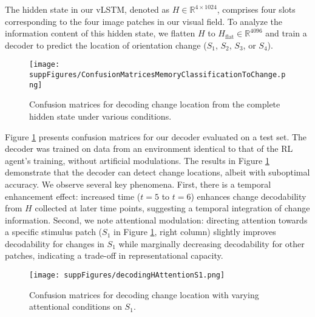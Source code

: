 \documentclass[12pt]{article}
\begin{document}
The hidden state in our vLSTM, denoted as $H \in \mathbb{R}^{4 \times 1024}$, comprises four slots corresponding to the four image patches in our visual field. To analyze the information content of this hidden state, we flatten $H$ to $H_\text{flat} \in \mathbb{R}^{4096}$ and train a decoder to predict the location of orientation change ($S_1$, $S_2$, $S_3$, or $S_4$).

\begin{figure}[htbp]
    \centering
    \texttt{[image: suppFigures/ConfusionMatricesMemoryClassificationToChange.png]}
    \caption{Confusion matrices for decoding change location from the complete hidden state under various conditions.}
    \label{fig:ConfMatHAllSlots}
\end{figure}


Figure \ref{fig:ConfMatHAllSlots} presents confusion matrices for our decoder evaluated on a test set. The decoder was trained on data from an environment identical to that of the RL agent's training, without artificial modulations. The results in Figure \ref{fig:ConfMatHAllSlots} demonstrate that the decoder can detect change locations, albeit with suboptimal accuracy. We observe several key phenomena. First, there is a temporal enhancement effect: increased time ($t=5$ to $t=6$) enhances change decodability from $H$ collected at later time points, suggesting a temporal integration of change information. Second, we note attentional modulation: directing attention towards a specific stimulus patch ($S_1$ in Figure \ref{fig:ConfMatHAllSlots}, right column) slightly improves decodability for changes in $S_1$ while marginally decreasing decodability for other patches, indicating a trade-off in representational capacity.

\begin{figure}[htbp]
    \centering
    \texttt{[image: suppFigures/decodingHAttentionS1.png]}
    \caption{Confusion matrices for decoding change location with varying attentional conditions on $S_1$.}
    \label{fig:ConfMatHAllSlotsCue025}
\end{figure}
\end{document}
